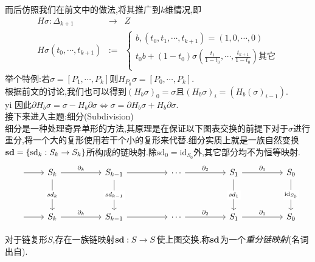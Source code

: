 \documentclass{article}
\begin{document}
    而后仿照我们在前文中的做法,将其推广到$k$维情况,即
    \begin{eqnarray*}
        H\sigma : \Delta_{k+1} &\to& Z\\
        H\sigma(t_0,\cdots,t_{k+1}) &:=& \left\{\begin{array}{c} b,(t_0,t_1,\cdots,t_{k+1}) = (1,0,\cdots,0)\\t_0b+(1-t_0)\sigma\left(\frac{t_1}{1-t_0},\cdots,\frac{t_{k+1}}{1-t_0}\right) \text{其它}\\\end{array}\right.
    \end{eqnarray*}
举个特例:若$\sigma = [P_1,\cdots,P_{k}]$则$H_{P_0}\sigma = [P_0,\cdots,P_k]$.\\
根据前文的讨论,我们也可以得到$(H_b\sigma)_0 = \sigma$且$(H_b\sigma)_i = (H_b(\sigma)_{i-1})$.\\yi
因此$\partial H_b \sigma = \sigma - H_b \partial \sigma \Leftrightarrow \sigma = \partial H_b \sigma + H_b \partial \sigma$.\\
接下来进入主题:细分(Subdivision)\\
细分是一种处理奇异单形的方法,其原理是在保证以下图表交换的前提下对于$\sigma$进行重分,将一个大的复形使用若干个小的复形来代替.细分实质上就是一族自然变换$\bold{sd} = \{\text{sd}_k : S_k \to S_k\}$所构成的链映射.除$\text{sd}_0 = \text{id}_{S_0}$外,其它部分均不为恒等映射.
\[\begin{tikzcd}
	{} & {S_k} && {S_{k-1}} && \cdots && {S_1} && {S_0} \\
	\\
	{} & {S_k} && {S_{k-1}} && \cdots && {S_1} && {S_0}
	\arrow["{\partial_k}", from=1-2, to=1-4]
	\arrow[from=1-4, to=1-6]
	\arrow["{\partial_2}", from=1-6, to=1-8]
	\arrow["{\partial_1}", from=1-8, to=1-10]
	\arrow["{\partial_k}", from=3-2, to=3-4]
	\arrow[from=3-4, to=3-6]
	\arrow["{\partial_2}", from=3-6, to=3-8]
	\arrow["{\partial_1}", from=3-8, to=3-10]
	\arrow["{sd_k}"{description}, from=1-2, to=3-2]
	\arrow["{sd_{k-1}}"{description}, from=1-4, to=3-4]
	\arrow["{sd_1}"{description}, from=1-8, to=3-8]
	\arrow["{\text{id}_{S_0}}"{description}, from=1-10, to=3-10]
	\arrow[from=1-1, to=1-2]
	\arrow[from=3-1, to=3-2]
\end{tikzcd}\]
\begin{theorem}
    对于链复形$S$,存在一族链映射$\bold{sd} : S \to S$使上图交换.称$\bold{sd}$为一个\emph{重分链映射}(名词出自\cite{姜伯驹2006同调论}).
\end{theorem}
\end{document}
